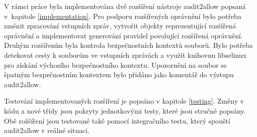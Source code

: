 V rámci práce byla implementována dvě rozšíření nástroje audit2allow popsaná
v~kapitole \ref{implementation}. Pro podporu rozšířených oprávnění bylo potřeba
změnit zpracování vstupních zpráv, vytvořit objekty reprezentující rozšířená
oprávnění a implementovat generování pravidel povolující rozšířená oprávnění.
Druhým rozšířením byla kontrola bezpečnostních kontextů souborů. Bylo potřeba
detekovat cesty k souborům ve vstupních zprávách a využít knihovnu libselinux
pro získání výchozího bezpečnostního kontextu. Upozornění na soubor se špatným
bezpečnostním kontextem bylo přidáno jako komentář do výstupu audit2allow.

Testování implementovaných rozšíření je popsáno v kapitole \ref{testing}. Změny
v kódu a nové třídy jsou pokryty jednotkovými testy, které jsou stručně popsány.
Obě rožšíření jsou testované také pomocí integračního testu, který spouští
audit2allow v reálné situaci.

